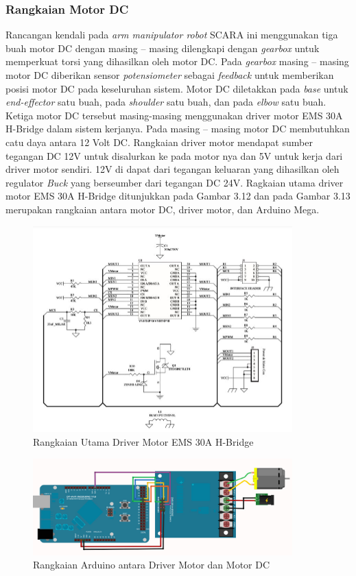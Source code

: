 \subsubsection{Rangkaian Motor DC}
Rancangan kendali pada \textit{arm manipulator robot} SCARA ini menggunakan tiga buah motor DC dengan masing – masing dilengkapi dengan \textit{gearbox} untuk memperkuat torsi yang dihasilkan oleh motor DC. Pada  \textit{gearbox} masing – masing motor  DC diberikan sensor \textit{potensiometer} sebagai \textit{feedback} untuk memberikan posisi motor DC pada keseluruhan sistem. Motor DC diletakkan pada \textit{base} untuk \textit{end-effector} satu buah, pada \textit{shoulder} satu buah, dan pada \textit{elbow} satu buah. Ketiga motor DC tersebut masing-masing menggunakan driver motor EMS 30A H-Bridge dalam sistem kerjanya. Pada masing – masing motor DC membutuhkan catu daya antara 12 Volt DC. Rangkaian driver motor mendapat sumber tegangan DC 12V untuk disalurkan ke pada motor nya dan 5V untuk kerja dari driver motor sendiri. 12V di dapat dari tegangan keluaran yang dihasilkan oleh regulator \textit{Buck} yang berseumber dari tegangan DC 24V. Ragkaian utama driver motor EMS 30A H-Bridge ditunjukkan pada Gambar 3.12 dan pada Gambar 3.13 merupakan rangkaian antara motor DC, driver motor, dan Arduino Mega.  
\begin{figure}[H]
	\centering
	\includegraphics[width=10cm]{gambar/rangakaiandriver.jpg}
	\caption{Rangkaian Utama Driver Motor EMS 30A H-Bridge}
\end{figure}
\begin{figure}[H]
	\centering
	\includegraphics[width=10cm]{gambar/drivermotor.jpg}
	\caption{Rangkaian Arduino antara Driver Motor dan Motor DC}
\end{figure}

